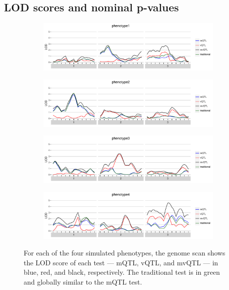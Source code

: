 \documentclass[9pt,twocolumn,twoside]{gsag3jnl}
\begin{document}
\subsection{LOD scores and nominal p-values}

\begin{figure}[t]
    \begin{subfigure}[b]{\linewidth}
        \includegraphics[width=\textwidth]{images/LOD_scan_phenotype1.pdf}
    \end{subfigure}
    \begin{subfigure}[b]{\linewidth}
        \includegraphics[width=\textwidth]{images/LOD_scan_phenotype2.pdf}
    \end{subfigure}
    \begin{subfigure}[b]{\linewidth}
        \includegraphics[width=\textwidth]{images/LOD_scan_phenotype3.pdf}
    \end{subfigure}
    \begin{subfigure}[b]{\linewidth}
        \includegraphics[width=\textwidth]{images/LOD_scan_phenotype4.pdf}
    \end{subfigure}
    \caption{
        For each of the four simulated phenotypes, the genome scan shows the LOD score of each test --- mQTL, vQTL, and mvQTL --- in blue, red, and black, respectively.
        The traditional test is in green and globally similar to the mQTL test.
    }
    \label{fig:lod_score_scans}
\end{figure}
\end{document}
